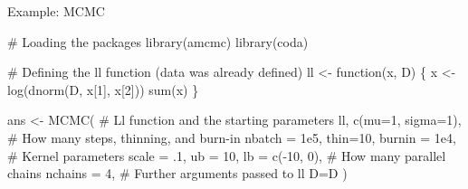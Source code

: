 \documentclass[9pt,ignorenonframetext,]{beamer}
\newenvironment{Shaded}{\begin{snugshade}}{\end{snugshade}}
\newcommand{\KeywordTok}[1]{\textcolor[rgb]{0.94,0.87,0.69}{#1}}
\newcommand{\DataTypeTok}[1]{\textcolor[rgb]{0.87,0.87,0.75}{#1}}
\newcommand{\DecValTok}[1]{\textcolor[rgb]{0.86,0.86,0.80}{#1}}
\newcommand{\FloatTok}[1]{\textcolor[rgb]{0.75,0.75,0.82}{#1}}
\newcommand{\StringTok}[1]{\textcolor[rgb]{0.80,0.58,0.58}{#1}}
\newcommand{\CommentTok}[1]{\textcolor[rgb]{0.50,0.62,0.50}{#1}}
\newcommand{\ControlFlowTok}[1]{\textcolor[rgb]{0.94,0.87,0.69}{#1}}
\newcommand{\OperatorTok}[1]{\textcolor[rgb]{0.94,0.94,0.82}{#1}}
\newcommand{\NormalTok}[1]{\textcolor[rgb]{0.80,0.80,0.80}{#1}}
\begin{document}
\begin{frame}[fragile,t]{Example: MCMC}

\footnotesize

\normalsize

\footnotesize

\begin{Shaded}
\begin{Highlighting}[]
\CommentTok{# Loading the packages}
\KeywordTok{library}\NormalTok{(amcmc)}
\KeywordTok{library}\NormalTok{(coda)}

\CommentTok{# Defining the ll function (data was already defined)}
\NormalTok{ll <-}\StringTok{ }\ControlFlowTok{function}\NormalTok{(x, D) \{}
\NormalTok{  x <-}\StringTok{ }\KeywordTok{log}\NormalTok{(}\KeywordTok{dnorm}\NormalTok{(D, x[}\DecValTok{1}\NormalTok{], x[}\DecValTok{2}\NormalTok{]))}
  \KeywordTok{sum}\NormalTok{(x)}
\NormalTok{\}}

\NormalTok{ans <-}\StringTok{ }\KeywordTok{MCMC}\NormalTok{(}
  \CommentTok{# Ll function and the starting parameters}
\NormalTok{  ll, }\KeywordTok{c}\NormalTok{(}\DataTypeTok{mu=}\DecValTok{1}\NormalTok{, }\DataTypeTok{sigma=}\DecValTok{1}\NormalTok{),}
  \CommentTok{# How many steps, thinning, and burn-in}
  \DataTypeTok{nbatch =} \FloatTok{1e5}\NormalTok{, }\DataTypeTok{thin=}\DecValTok{10}\NormalTok{, }\DataTypeTok{burnin =} \FloatTok{1e4}\NormalTok{,}
  \CommentTok{# Kernel parameters}
  \DataTypeTok{scale =}\NormalTok{ .}\DecValTok{1}\NormalTok{, }\DataTypeTok{ub =} \DecValTok{10}\NormalTok{, }\DataTypeTok{lb =} \KeywordTok{c}\NormalTok{(}\OperatorTok{-}\DecValTok{10}\NormalTok{, }\DecValTok{0}\NormalTok{),}
  \CommentTok{# How many parallel chains}
  \DataTypeTok{nchains =} \DecValTok{4}\NormalTok{,}
  \CommentTok{# Further arguments passed to ll}
  \DataTypeTok{D=}\NormalTok{D}
\NormalTok{  )}
\end{Highlighting}
\end{Shaded}

\normalsize

\end{frame}
\end{document}
